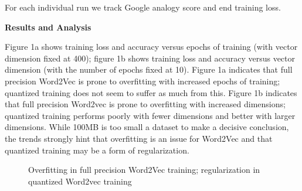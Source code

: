 \documentclass{article} %
\begin{document}
For each individual run we track Google analogy score and end training loss.

\textbf{Results and Analysis}

Figure 1a shows training loss and accuracy versus epochs of training
(with vector dimension fixed at 400); figure 1b shows training loss
and accuracy versus vector dimension (with the number of epochs fixed
at 10). Figure 1a indicates that full precision Word2Vec is prone to overfitting with
increased epochs of training; quantized training does not seem to
suffer as much from this. Figure 1b indicates that full precision Word2vec is prone
to overfitting with increased dimensions; quantized training performs
poorly with fewer dimensions and better with larger dimensions. While
100MB is too small a dataset to make a decisive conclusion, the trends
strongly hint that overfitting is an issue for Word2Vec and that
quantized training may be a form of regularization.

\begin{figure}%
    \centering
    \qquad
    \caption{Overfitting in full precision Word2Vec training; regularization in quantized Word2vec training}%
    \label{fig:overfitting}
\end{figure}
\end{document}
